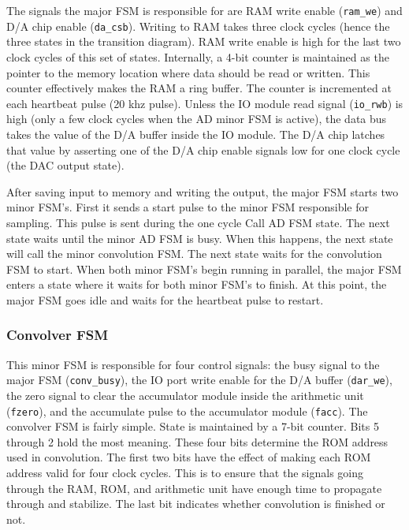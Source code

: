 \documentclass[12pt]{article}
\begin{document}
	The signals the major FSM is responsible for are RAM write enable
	(\texttt{ram\_we}) and D/A chip enable (\texttt{da\_csb}).  Writing to RAM
	takes three clock cycles (hence the three states in the transition
	diagram).  RAM write enable is high for the last two clock cycles of this
	set of states.  Internally, a 4-bit counter is maintained as the pointer to
	the memory location where data should be read or written.  This counter
	effectively makes the RAM a ring buffer.  The counter is incremented at
	each heartbeat pulse (20 khz pulse).  Unless the IO module read signal
	(\texttt{io\_rwb}) is high (only a few clock cycles when the AD minor FSM
	is active), the data bus takes the value of the D/A buffer inside the IO
	module.  The D/A chip latches that value by asserting one of the D/A chip
	enable signals low for one clock cycle (the DAC output state).

	After saving input to memory and writing the output, the major FSM starts
	two minor FSM's.  First it sends a start pulse to the minor FSM responsible
	for sampling.  This pulse is sent during the one cycle Call AD FSM state.
	The next state waits until the minor AD FSM is busy.  When this happens, the
	next state will call the minor convolution FSM.  The next state waits for the
	convolution FSM to start.  When both minor FSM's begin running in parallel,
	the major FSM enters a state where it waits for both minor FSM's to finish.
	At this point, the major FSM goes idle and waits for the heartbeat pulse to
	restart.

		\subsubsection{Convolver FSM}
		This minor FSM is responsible for four control signals: the busy signal
		to the major FSM (\texttt{conv\_busy}), the IO port write enable for
		the D/A buffer (\texttt{dar\_we}), the zero signal to clear the
		accumulator module inside the arithmetic unit (\texttt{fzero}), and the
		accumulate pulse to the accumulator module (\texttt{facc}).  The
		convolver FSM is fairly simple.  State is maintained by a 7-bit
		counter.  Bits 5 through 2 hold the most meaning.  These four bits
		determine the ROM address used in convolution.  The first two bits have
		the effect of making each ROM address valid for four clock cycles.
		This is to ensure that the signals going through the RAM, ROM, and
		arithmetic unit have enough time to propagate through and stabilize.
		The last bit indicates whether convolution is finished or not.
		
\end{document}
